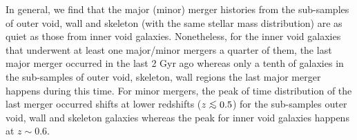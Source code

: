 \documentclass[a4paper,fleqn,usenatbib,letter]{mnras}
\newcommand{\lsim}{\mathrel{\hbox{\rlap{\lower.55ex\hbox{$\sim$}} \kern-.3em\raise.4ex\hbox{$<$}}}}
\begin{document}
In general, we find that the major (minor) merger histories from the sub-samples of outer void, wall and skeleton (with the same stellar mass distribution) are as quiet as those from inner void galaxies. Nonetheless, for the inner void galaxies that underwent at least one major/minor mergers  a quarter of them, the last major merger occurred in the last 2 Gyr ago whereas only a tenth of galaxies in  the sub-samples of outer void, skeleton, wall regions the last major merger happens during this time. For minor mergers, the peak of time distribution of the last merger occurred shifts at lower redshifts ($z\lsim 0.5$) for the sub-samples outer void, wall and skeleton galaxies whereas  the peak for inner void galaxies happens at $z\sim 0.6$.   



\end{document}
